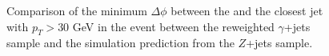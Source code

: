 \begin{figure}[!htbp]
\begin{center}
\caption{Comparison of the minimum $\Delta\phi$ between the \met and the closest jet with $p_{T}>30$ GeV
in the event between the reweighted $\gamma$+jets sample and the 
simulation prediction from the $Z$+jets sample.}
\label{fig:PhotonJetsClosureTest_DPhi}
\end{center}
\end{figure}


